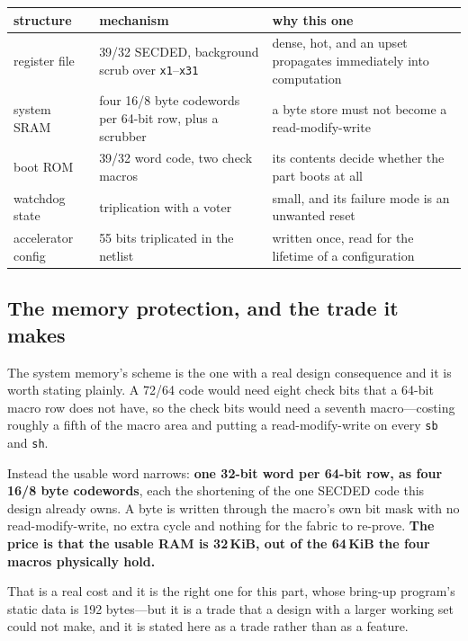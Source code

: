 \documentclass[11pt,a4paper]{article}
\begin{document}
\begin{center}
\begin{tabular}{L{3.4cm}L{4.3cm}L{5.2cm}}
\toprule
structure & mechanism & why this one \\
\midrule
register file & \num{39}/\num{32} SECDED, background scrub over
  \texttt{x1}--\texttt{x31} & dense, hot, and an upset propagates
  immediately into computation \\
system SRAM & four \num{16}/\num{8} byte codewords per \num{64}-bit row,
  plus a scrubber & a byte store must not become a read-modify-write \\
boot ROM & \num{39}/\num{32} word code, two check macros & its contents
  decide whether the part boots at all \\
watchdog state & triplication with a voter & small, and its failure mode
  is an unwanted reset \\
accelerator config & \num{55} bits triplicated in the netlist & written
  once, read for the lifetime of a configuration \\
\bottomrule
\end{tabular}
\end{center}

\subsection{The memory protection, and the trade it makes}

The system memory's scheme is the one with a real design consequence and
it is worth stating plainly. A \num{72}/\num{64} code would need eight
check bits that a \num{64}-bit macro row does not have, so the check bits
would need a seventh macro---costing roughly a fifth of the macro area
and putting a read-modify-write on every \texttt{sb} and \texttt{sh}.

Instead the usable word narrows: \textbf{one \num{32}-bit word per
\num{64}-bit row, as four \num{16}/\num{8} byte codewords}, each the
shortening of the one SECDED code this design already owns. A byte is
written through the macro's own bit mask with no read-modify-write, no
extra cycle and nothing for the fabric to re-prove. \textbf{The price is
that the usable RAM is \num{32}\,KiB, out of the \num{64}\,KiB the four
macros physically hold.}

That is a real cost and it is the right one for this part, whose
bring-up program's static data is \num{192} bytes---but it is a trade
that a design with a larger working set could not make, and it is stated
here as a trade rather than as a feature.
\end{document}

